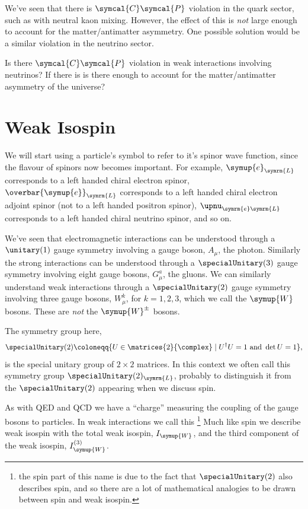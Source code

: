 \documentclass[fleqn]{NotesClass}
\newcommand{\Pparticle}[1]{\symup{#1}}
\newcommand{\Penominus}{\ensuremath{\Pparticle{e}}}
\newcommand{\PW}{\ensuremath{\Pparticle{W}}}
\newcommand{\PWpm}{\ensuremath{\Pparticle{W}^{\pm}}}
\newcommand{\hermit}{\dagger}
\newcommand{\diracadjoint}[1]{\overbar{#1}}
\newcommand{\Left}{\symrm{L}}
\newcommand{\parity}{\symcal{P}}
\newcommand{\chargeConjugation}{\symcal{C}}
\begin{document}
    We've seen that there is \(\chargeConjugation\parity\) violation in the quark sector, such as with neutral kaon mixing.
    However, the effect of this is \emph{not} large enough to account for the matter/antimatter asymmetry.
    One possible solution would be a similar violation in the neutrino sector.
    \begin{openquestion}
        Is there \(\chargeConjugation\parity\) violation in weak interactions involving neutrinos?
        If there is is there enough to account for the matter/antimatter asymmetry of the universe?
    \end{openquestion}
    
    \section{Weak Isospin}
    \begin{rmk}
        We will start using a particle's symbol to refer to it's spinor wave function, since the flavour of spinors now becomes important.
        For example, \(\Penominus_{\Left}\) corresponds to a left handed chiral electron spinor, \(\diracadjoint{\Penominus}_{\Left}\) corresponds to a left handed chiral electron adjoint spinor (not to a left handed positron spinor), \(\upnu_{\symrm{e}\Left}\) corresponds to a left handed chiral neutrino spinor, and so on.
    \end{rmk}
    We've seen that electromagnetic interactions can be understood through a \(\unitary(1)\) gauge symmetry involving a gauge boson, \(A_\mu\), the photon.
    Similarly the strong interactions can be understood through a \(\specialUnitary(3)\) gauge symmetry involving eight gauge bosons, \(G^a_\mu\), the gluons.
    We can similarly understand weak interactions through a \(\specialUnitary(2)\) gauge symmetry involving three gauge bosons, \(W_\mu^k\), for \(k = 1, 2, 3\), which we call the \(\PW\) bosons.
    These are \emph{not} the \(\PWpm\) bosons.
    
    The symmetry group here,
    \begin{equation}
        \specialUnitary(2) \coloneqq \{U \in \matrices{2}{\complex} \mid U^\hermit U = 1 \text{ and } \det U = 1\},
    \end{equation}
    is the special unitary group of \(2 \times 2\) matrices.
    In this context we often call this symmetry group \(\specialUnitary(2)_{\Left}\), probably to distinguish it from the \(\specialUnitary(2)\) appearing when we discuss spin.
    
    As with QED and QCD we have a \enquote{charge} measuring the coupling of the gauge bosons to particles.
    In weak interactions we call this \footnote{the spin part of this name is due to the fact that \(\specialUnitary(2)\) also describes spin, and so there are a lot of mathematical analogies to be drawn between spin and weak isospin.}
    Much like spin we describe weak isospin with the total weak isospin, \(I_{\PW}\), and the third component of the weak isospin, \(I_{\PW}^{(3)}\).
    
\end{document}
